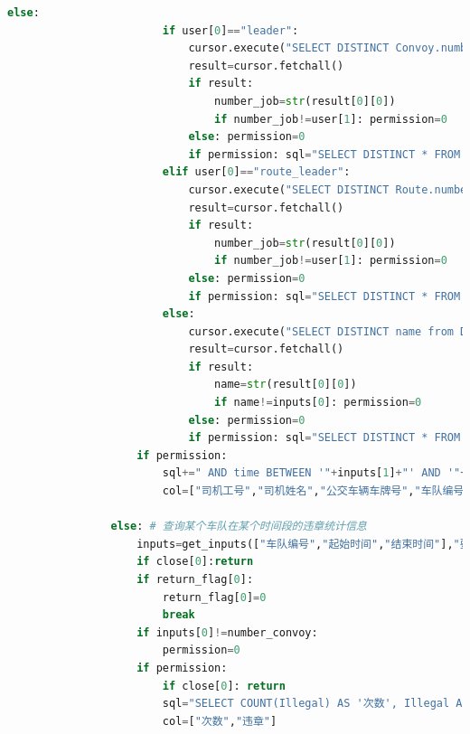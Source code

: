 \documentclass {article}
\begin{document}
\begin{lstlisting}[language=python]
                    else: 
                        if user[0]=="leader": 
                            cursor.execute("SELECT DISTINCT Convoy.number_job_leader FROM Convoy, Bus, Driver WHERE Convoy.number_convoy=Bus.number_convoy and Bus.number_route=Driver.number_route and Driver.name='"+inputs[0]+"';")
                            result=cursor.fetchall()
                            if result:
                                number_job=str(result[0][0])
                                if number_job!=user[1]: permission=0
                            else: permission=0
                            if permission: sql="SELECT DISTINCT * FROM Illegal WHERE number_convoy="+str(number_convoy)+" and name='"+inputs[0]+"'"
                        elif user[0]=="route_leader": 
                            cursor.execute("SELECT DISTINCT Route.number_job_routeleader FROM Route, Driver WHERE Route.number_route=Driver.number_route and Driver.name='"+inputs[0]+"';")
                            result=cursor.fetchall()
                            if result:
                                number_job=str(result[0][0])
                                if number_job!=user[1]: permission=0      
                            else: permission=0                      
                            if permission: sql="SELECT DISTINCT * FROM Illegal WHERE number_route="+str(number_route)+" and name='"+inputs[0]+"'"
                        else:
                            cursor.execute("SELECT DISTINCT name from Driver WHERE number_job="+user[1])
                            result=cursor.fetchall()
                            if result:
                                name=str(result[0][0])
                                if name!=inputs[0]: permission=0
                            else: permission=0
                            if permission: sql="SELECT DISTINCT * FROM Illegal WHERE name='"+inputs[0]+"'"
                    if permission: 
                        sql+=" AND time BETWEEN '"+inputs[1]+"' AND '"+inputs[2]+"';"
                        col=["司机工号","司机姓名","公交车辆车牌号","车队编号","线路编号","站点","时间","违章"]

                else: # 查询某个车队在某个时间段的违章统计信息
                    inputs=get_inputs(["车队编号","起始时间","结束时间"],"要查询某个车队在某个时间段的违章统计信息，请先输入车队编号、时间段的起始时间和结束时间（YYYY-mm-dd HH:ii:ss格式）：",inputs[:3])
                    if close[0]:return
                    if return_flag[0]:
                        return_flag[0]=0
                        break
                    if inputs[0]!=number_convoy:
                        permission=0
                    if permission:
                        if close[0]: return 
                        sql="SELECT COUNT(Illegal) AS '次数', Illegal AS '违章' FROM Illegal WHERE number_convoy="+inputs[0]+" AND time BETWEEN '"+inputs[1]+"' AND '"+inputs[2]+"';"
                        col=["次数","违章"]
                

\end{lstlisting}
\end{document}
